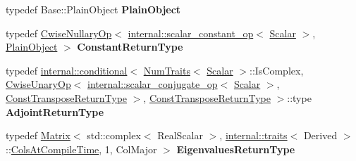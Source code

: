 \begin{DoxyCompactItemize}
\item 
\mbox{\label{class_eigen_1_1_matrix_base_aaf60e25933045913a5ee91ef197878df}} 
typedef Base\+::\+Plain\+Object {\bfseries Plain\+Object}
\item 
\mbox{\label{class_eigen_1_1_matrix_base_ab5d1eea5bb5387e8c704cd66a9ae3053}} 
typedef \mbox{\hyperlink{class_eigen_1_1_cwise_nullary_op}{Cwise\+Nullary\+Op}}$<$ \mbox{\hyperlink{struct_eigen_1_1internal_1_1scalar__constant__op}{internal\+::scalar\+\_\+constant\+\_\+op}}$<$ \mbox{\hyperlink{class_eigen_1_1_dense_base_a5feed465b3a8e60c47e73ecce83e39a2}{Scalar}} $>$, \mbox{\hyperlink{class_eigen_1_1_dense_base_aae45af9b5aca5a9caae98fd201f47cc4}{Plain\+Object}} $>$ {\bfseries Constant\+Return\+Type}
\item 
\mbox{\label{class_eigen_1_1_matrix_base_aec94da58c4464ffe7e14fdc8eb4a06a7}} 
typedef \mbox{\hyperlink{struct_eigen_1_1internal_1_1conditional}{internal\+::conditional}}$<$ \mbox{\hyperlink{struct_eigen_1_1_num_traits}{Num\+Traits}}$<$ \mbox{\hyperlink{class_eigen_1_1_dense_base_a5feed465b3a8e60c47e73ecce83e39a2}{Scalar}} $>$\+::Is\+Complex, \mbox{\hyperlink{class_eigen_1_1_cwise_unary_op}{Cwise\+Unary\+Op}}$<$ \mbox{\hyperlink{struct_eigen_1_1internal_1_1scalar__conjugate__op}{internal\+::scalar\+\_\+conjugate\+\_\+op}}$<$ \mbox{\hyperlink{class_eigen_1_1_dense_base_a5feed465b3a8e60c47e73ecce83e39a2}{Scalar}} $>$, \mbox{\hyperlink{class_eigen_1_1_transpose}{Const\+Transpose\+Return\+Type}} $>$, \mbox{\hyperlink{class_eigen_1_1_transpose}{Const\+Transpose\+Return\+Type}} $>$\+::type {\bfseries Adjoint\+Return\+Type}
\item 
\mbox{\label{class_eigen_1_1_matrix_base_a98c15e0629a59858a82324c04055d107}} 
typedef \mbox{\hyperlink{class_eigen_1_1_matrix}{Matrix}}$<$ std\+::complex$<$ Real\+Scalar $>$, \mbox{\hyperlink{struct_eigen_1_1internal_1_1traits}{internal\+::traits}}$<$ Derived $>$\+::\mbox{\hyperlink{class_eigen_1_1_dense_base_a86241c772c74c04eeeb0480b99c5ab77a787f85fd67ee5985917eb2cef6e70441}{Cols\+At\+Compile\+Time}}, 1, Col\+Major $>$ {\bfseries Eigenvalues\+Return\+Type}
\item 
\mbox{\label{class_eigen_1_1_matrix_base_ace842e3614c2ed0cc7c240f5c99bf5a6}} 

\end{DoxyCompactItemize}
